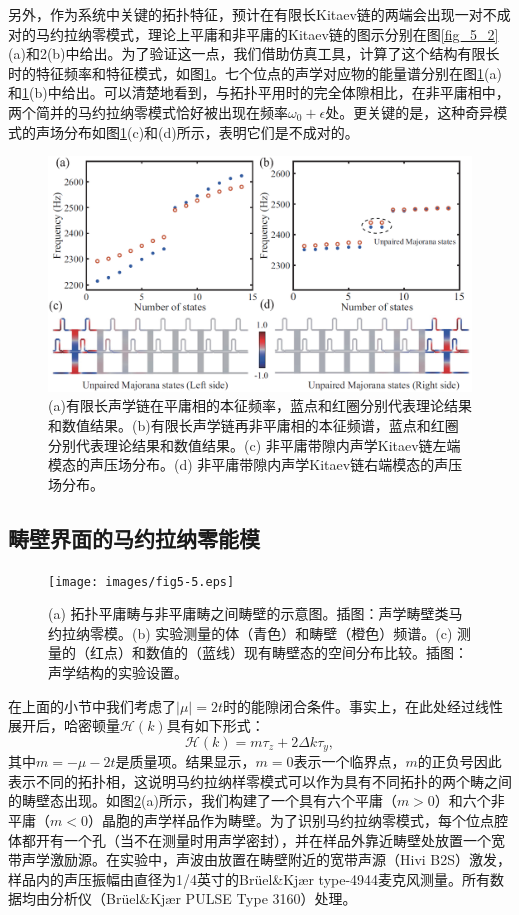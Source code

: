 另外，作为系统中关键的拓扑特征，预计在有限长Kitaev链的两端会出现一对不成对的马约拉纳零模式，理论上平庸和非平庸的Kitaev链的图示分别在图\ref{fig_5_2}(a)和2(b)中给出。为了验证这一点，我们借助仿真工具，计算了这个结构有限长时的特征频率和特征模式，如图\ref{fig_5_4}。七个位点的声学对应物的能量谱分别在图\ref{fig_5_4}(a)和\ref{fig_5_4}(b)中给出。可以清楚地看到，与拓扑平用时的完全体隙相比，在非平庸相中，两个简并的马约拉纳零模式恰好被出现在频率\(\omega_{0} + \epsilon\)处。更关键的是，这种奇异模式的声场分布如图\ref{fig_5_4}(c)和(d)所示，表明它们是不成对的。
\begin{figure}[h!]
    \centering
    \includegraphics[width=1\textwidth]{images/fig5-4.eps} 
    \caption{(a)有限长声学链在平庸相的本征频率，蓝点和红圈分别代表理论结果和数值结果。(b)有限长声学链再非平庸相的本征频谱，蓝点和红圈分别代表理论结果和数值结果。(c) 非平庸带隙内声学Kitaev链左端模态的声压场分布。(d) 非平庸带隙内声学Kitaev链右端模态的声压场分布。}
    \label{fig_5_4}
\end{figure}

\subsection{畴壁界面的马约拉纳零能模}

\begin{figure}[h!]
    \centering
    \texttt{[image: images/fig5-5.eps]} 
    \caption{(a) 拓扑平庸畴与非平庸畴之间畴壁的示意图。插图：声学畴壁类马约拉纳零模。(b) 实验测量的体（青色）和畴壁（橙色）频谱。(c) 测量的（红点）和数值的（蓝线）现有畴壁态的空间分布比较。插图：声学结构的实验设置。}
    \label{fig_5_5}
\end{figure}

在上面的小节中我们考虑了\(\vert \mu \vert = 2t\)时的能隙闭合条件。事实上，在此处经过线性展开后，哈密顿量\(\mathcal{H}(k)\)具有如下形式：
\begin{equation}\label{eq5-21}
    \mathcal{H}(k) = m\tau_{z} + 2\Delta k\tau_{y},
\end{equation}
其中\(m = -\mu - 2t\)是质量项。结果显示，\(m = 0\)表示一个临界点，\(m\)的正负号因此表示不同的拓扑相，这说明马约拉纳样零模式可以作为具有不同拓扑的两个畴之间的畴壁态出现。如图\ref{fig_5_5}(a)所示，我们构建了一个具有六个平庸（\(m > 0\)）和六个非平庸（\(m < 0\)）晶胞的声学样品作为畴壁。为了识别马约拉纳零模式，每个位点腔体都开有一个孔（当不在测量时用声学密封），并在样品外靠近畴壁处放置一个宽带声学激励源。在实验中，声波由放置在畴壁附近的宽带声源（Hivi B2S）激发，样品内的声压振幅由直径为1/4英寸的Brüel\&Kjær type-4944麦克风测量。所有数据均由分析仪（Brüel\&Kjær PULSE Type 3160）处理。

